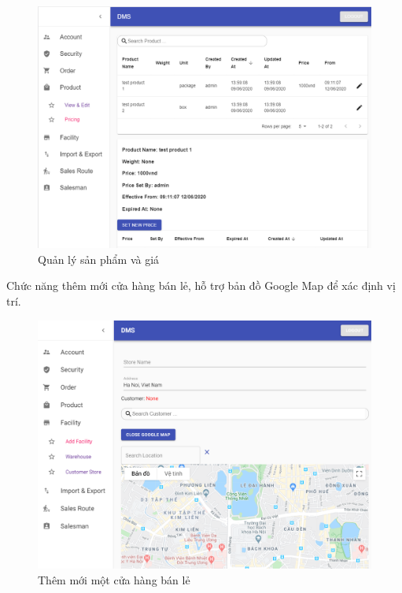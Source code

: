 \begin{figure}[H]
\centering
\includegraphics[width=15cm]{images/demo/product-price.png}
\caption{Quản lý sản phẩm và giá}
\end{figure}

Chức năng thêm mới cửa hàng bán lẻ, hỗ trợ bản đồ
Google Map để xác định vị trí.
\begin{figure}[H]
\centering
\includegraphics[width=15cm]{images/demo/add-customer-store.png}
\caption{Thêm mới một cửa hàng bán lẻ}
\end{figure}

